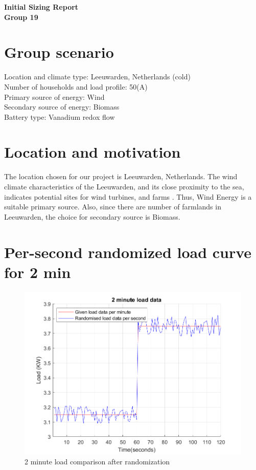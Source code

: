 \noindent \textbf{Initial Sizing Report}\\
\textbf{Group 19}

\section{Group scenario}
Location and climate type: Leeuwarden, Netherlands (cold)\\
Number of households and load profile: 50(A) \\
Primary source of energy: Wind \\
Secondary source of energy: Biomass \\
Battery type: Vanadium redox flow \\ 


\section{Location and motivation}

The location chosen for our project is Leeuwarden, Netherlands. The wind climate characteristics of the Leeuwarden, and its close proximity to the sea, indicates potential sites for wind turbines, and farms \citep{Power}. Thus, Wind Energy is a suitable primary source. Also, since there are number of farmlands in Leeuwarden, the choice for secondary source is Biomass.

\section{Per-second randomized load curve for 2 min}
\begin{figure} [H]
    \centering
    \includegraphics[width=0.5 \linewidth]{w1/images/two_min_load_comparison.png}
    \caption{2 minute load comparison after randomization}
    \label{fig:2_min_load}
\end{figure}

